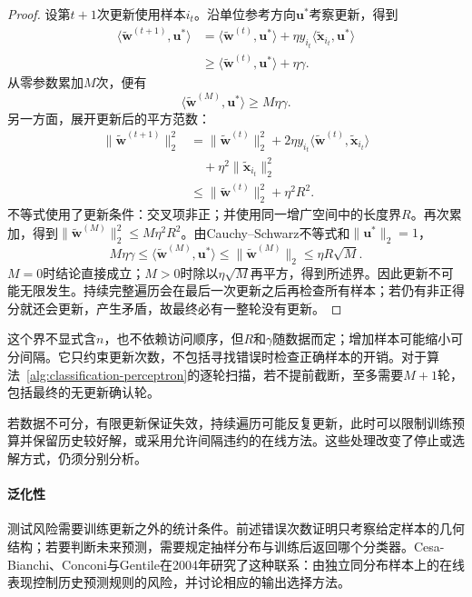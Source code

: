 \begin{proof}
  设第$t+1$次更新使用样本$i_t$。沿单位参考方向$\bm{u}^\ast$考察更新，得到
  \begin{align*}
    \langle\tilde{\bm{w}}^{(t+1)},\bm{u}^\ast\rangle
      &=\langle\tilde{\bm{w}}^{(t)},\bm{u}^\ast\rangle
        +\eta y_{i_t}\langle\tilde{\bm{x}}_{i_t},\bm{u}^\ast\rangle\\
      &\geq\langle\tilde{\bm{w}}^{(t)},\bm{u}^\ast\rangle+\eta\gamma .
  \end{align*}
  从零参数累加$M$次，便有
  \[
    \langle\tilde{\bm{w}}^{(M)},\bm{u}^\ast\rangle
      \geq M\eta\gamma .
  \]
  另一方面，展开更新后的平方范数：
  \begin{align*}
    \|\tilde{\bm{w}}^{(t+1)}\|_2^2
      &=\|\tilde{\bm{w}}^{(t)}\|_2^2
        +2\eta y_{i_t}
          \langle\tilde{\bm{w}}^{(t)},\tilde{\bm{x}}_{i_t}\rangle\\
      &\quad+\eta^2\|\tilde{\bm{x}}_{i_t}\|_2^2\\
      &\leq\|\tilde{\bm{w}}^{(t)}\|_2^2+\eta^2R^2 .
  \end{align*}
  不等式使用了更新条件：交叉项非正；并使用同一增广空间中的长度界$R$。再次累加，得到$\|\tilde{\bm{w}}^{(M)}\|_2^2\leq M\eta^2R^2$。由Cauchy--Schwarz不等式和$\|\bm{u}^\ast\|_2=1$，
  \[
    M\eta\gamma
      \leq\langle\tilde{\bm{w}}^{(M)},\bm{u}^\ast\rangle
      \leq\|\tilde{\bm{w}}^{(M)}\|_2
      \leq\eta R\sqrt{M}.
  \]
  $M=0$时结论直接成立；$M>0$时除以$\eta\sqrt M$再平方，得到所述界。因此更新不可能无限发生。持续完整遍历会在最后一次更新之后再检查所有样本；若仍有非正得分就还会更新，产生矛盾，故最终必有一整轮没有更新。
\end{proof}

这个界不显式含$n$，也不依赖访问顺序，但$R$和$\gamma$随数据而定；增加样本可能缩小可分间隔。它只约束更新次数，不包括寻找错误时检查正确样本的开销。对于算法~\ref{alg:classification-perceptron}的逐轮扫描，若不提前截断，至多需要$M+1$轮，包括最终的无更新确认轮。

若数据不可分，有限更新保证失效，持续遍历可能反复更新，此时可以限制训练预算并保留历史较好解，或采用允许间隔违约的在线方法。这些处理改变了停止或选解方式，仍须分别分析。

\paragraph{泛化性}
测试风险需要训练更新之外的统计条件。前述错误次数证明只考察给定样本的几何结构；若要判断未来预测，需要规定抽样分布与训练后返回哪个分类器。Cesa-Bianchi、Conconi与Gentile在2004年研究了这种联系：由独立同分布样本上的在线表现控制历史预测规则的风险，并讨论相应的输出选择方法。

